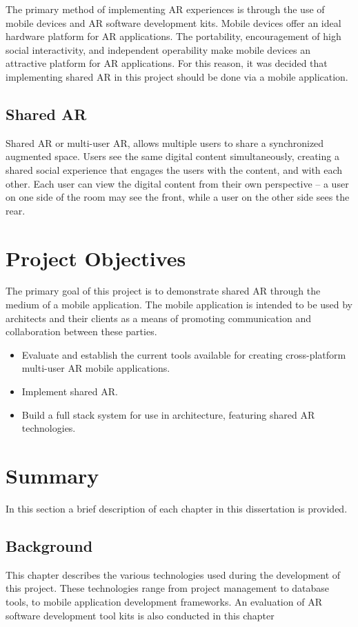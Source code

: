 The primary method of implementing AR experiences is through the use of mobile devices and AR software development kits. Mobile devices offer an ideal hardware platform for AR applications. The portability, encouragement of high social interactivity, and independent operability \cite{hwang2012context} make mobile devices an attractive platform for AR applications. For this reason, it was decided that implementing shared AR in this project should be done via a mobile application. 

\subsection{Shared AR}
Shared AR or multi-user AR, allows multiple users to share a synchronized augmented space. Users see the same digital content simultaneously, creating a shared social experience that engages the users with the content, and with each other.  Each user can view the digital content from their own perspective – a user on one side of the room may see the front, while a user on the other side sees the rear. 


\section{Project Objectives}
The primary goal of this project is to demonstrate shared AR through the medium of a mobile application. The mobile application is intended to be used by architects and their clients as a means of promoting communication and collaboration between these parties.

\begin{itemize}
    \item Evaluate and establish the current tools available for creating cross-platform multi-user AR mobile applications.
    \item Implement shared AR.
    \item Build a full stack system for use in architecture, featuring shared AR technologies. 
\end{itemize}

\section{Summary} 
In this section a brief description of each chapter in this dissertation is provided. 

\subsection{Background}
This chapter describes the various technologies used during the development of this project. These technologies range from project management to database tools, to mobile application development frameworks. An evaluation of AR software development tool kits is also conducted in this chapter

